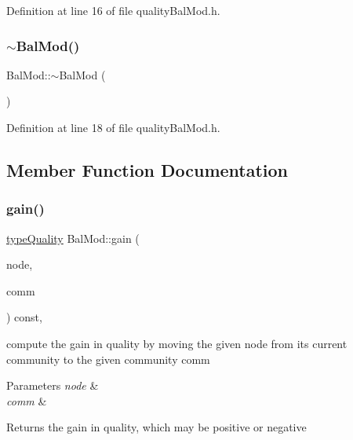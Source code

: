 Definition at line 16 of file quality\+Bal\+Mod.\+h.

\mbox{\label{classBalMod_a73c75118b324e532c821d5d7fdc8cc44}} 
\subsubsection{\texorpdfstring{$\sim$\+Bal\+Mod()}{~BalMod()}}
{\footnotesize\ttfamily Bal\+Mod\+::$\sim$\+Bal\+Mod (\begin{DoxyParamCaption}{ }\end{DoxyParamCaption})\hspace{0.3cm}{\ttfamily [inline]}}



Definition at line 18 of file quality\+Bal\+Mod.\+h.



\subsection{Member Function Documentation}
\mbox{\label{classBalMod_a5e65ffa1b97d2455a552ed98cb003bcc}} 
\subsubsection{\texorpdfstring{gain()}{gain()}}
{\footnotesize\ttfamily \hyperlink{qualityInterface_8h_a15a3ec6041e6e02d00d2eff22c20fd94}{type\+Quality} Bal\+Mod\+::gain (\begin{DoxyParamCaption}\item[{const \hyperlink{edge_8h_a5fbd20c46956d479cb10afc9855223f6}{type\+Vertex} \&}]{node,  }\item[{const \hyperlink{graphUndirectedGroupable_8h_a914da95c9ea7f14f4b7f875c36818556}{type\+Community} \&}]{comm }\end{DoxyParamCaption}) const\hspace{0.3cm}{\ttfamily [inline]}, {\ttfamily [virtual]}}

compute the gain in quality by moving the given node from its current community to the given community comm 
\begin{DoxyParams}{Parameters}
{\em node} & \\
\hline
{\em comm} & \\
\hline
\end{DoxyParams}
\begin{DoxyReturn}{Returns}
the gain in quality, which may be positive or negative 
\end{DoxyReturn}


